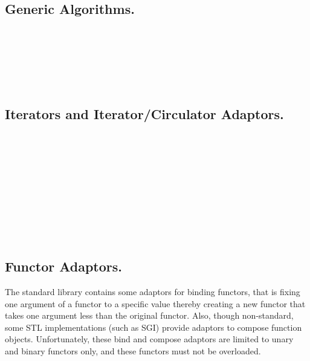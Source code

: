 \\
\\
 
\subsection*{Generic Algorithms.}

\\
\\
\\
\\
\\

\subsection*{Iterators and Iterator/Circulator Adaptors.}

\\
\\
\\
\\
\\
\\
\\
\\
\\

\subsection*{Functor Adaptors.}

The standard library contains some adaptors for binding functors, that
is fixing one argument of a functor to a specific value thereby
creating a new functor that takes one argument less than the original
functor.  Also, though non-standard, some STL implementations (such as
SGI) provide adaptors to compose function objects. Unfortunately,
these bind and compose adaptors are limited to unary and binary
functors only, and these functors must not be overloaded.

